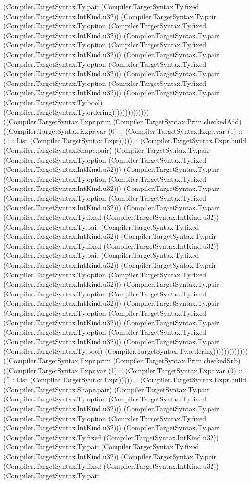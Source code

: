 \documentclass[11pt]{article}
\begin{document}
(Compiler.TargetSyntax.Ty.pair (Compiler.TargetSyntax.Ty.fixed (Compiler.TargetSyntax.IntKind.u32)) (Compiler.TargetSyntax.Ty.pair (Compiler.TargetSyntax.Ty.option (Compiler.TargetSyntax.Ty.fixed (Compiler.TargetSyntax.IntKind.u32))) (Compiler.TargetSyntax.Ty.pair (Compiler.TargetSyntax.Ty.option (Compiler.TargetSyntax.Ty.fixed (Compiler.TargetSyntax.IntKind.u32))) (Compiler.TargetSyntax.Ty.pair (Compiler.TargetSyntax.Ty.option (Compiler.TargetSyntax.Ty.fixed (Compiler.TargetSyntax.IntKind.u32))) (Compiler.TargetSyntax.Ty.pair (Compiler.TargetSyntax.Ty.option (Compiler.TargetSyntax.Ty.fixed (Compiler.TargetSyntax.IntKind.u32))) (Compiler.TargetSyntax.Ty.pair (Compiler.TargetSyntax.Ty.bool) (Compiler.TargetSyntax.Ty.ordering)))))))))))))) ((Compiler.TargetSyntax.Expr.prim (Compiler.TargetSyntax.Prim.checkedAdd) ((Compiler.TargetSyntax.Expr.var (0) :: (Compiler.TargetSyntax.Expr.var (1) :: ([] : List (Compiler.TargetSyntax.Expr))))) :: (Compiler.TargetSyntax.Expr.build (Compiler.TargetSyntax.Shape.pair) (Compiler.TargetSyntax.Ty.pair (Compiler.TargetSyntax.Ty.option (Compiler.TargetSyntax.Ty.fixed (Compiler.TargetSyntax.IntKind.u32))) (Compiler.TargetSyntax.Ty.pair (Compiler.TargetSyntax.Ty.option (Compiler.TargetSyntax.Ty.fixed (Compiler.TargetSyntax.IntKind.u32))) (Compiler.TargetSyntax.Ty.pair (Compiler.TargetSyntax.Ty.option (Compiler.TargetSyntax.Ty.fixed (Compiler.TargetSyntax.IntKind.u32))) (Compiler.TargetSyntax.Ty.pair (Compiler.TargetSyntax.Ty.fixed (Compiler.TargetSyntax.IntKind.u32)) (Compiler.TargetSyntax.Ty.pair (Compiler.TargetSyntax.Ty.fixed (Compiler.TargetSyntax.IntKind.u32)) (Compiler.TargetSyntax.Ty.pair (Compiler.TargetSyntax.Ty.fixed (Compiler.TargetSyntax.IntKind.u32)) (Compiler.TargetSyntax.Ty.pair (Compiler.TargetSyntax.Ty.fixed (Compiler.TargetSyntax.IntKind.u32)) (Compiler.TargetSyntax.Ty.pair (Compiler.TargetSyntax.Ty.option (Compiler.TargetSyntax.Ty.fixed (Compiler.TargetSyntax.IntKind.u32))) (Compiler.TargetSyntax.Ty.pair (Compiler.TargetSyntax.Ty.option (Compiler.TargetSyntax.Ty.fixed (Compiler.TargetSyntax.IntKind.u32))) (Compiler.TargetSyntax.Ty.pair (Compiler.TargetSyntax.Ty.option (Compiler.TargetSyntax.Ty.fixed (Compiler.TargetSyntax.IntKind.u32))) (Compiler.TargetSyntax.Ty.pair (Compiler.TargetSyntax.Ty.option (Compiler.TargetSyntax.Ty.fixed (Compiler.TargetSyntax.IntKind.u32))) (Compiler.TargetSyntax.Ty.pair (Compiler.TargetSyntax.Ty.bool) (Compiler.TargetSyntax.Ty.ordering))))))))))))) ((Compiler.TargetSyntax.Expr.prim (Compiler.TargetSyntax.Prim.checkedSub) ((Compiler.TargetSyntax.Expr.var (1) :: (Compiler.TargetSyntax.Expr.var (0) :: ([] : List (Compiler.TargetSyntax.Expr))))) :: (Compiler.TargetSyntax.Expr.build (Compiler.TargetSyntax.Shape.pair) (Compiler.TargetSyntax.Ty.pair (Compiler.TargetSyntax.Ty.option (Compiler.TargetSyntax.Ty.fixed (Compiler.TargetSyntax.IntKind.u32))) (Compiler.TargetSyntax.Ty.pair (Compiler.TargetSyntax.Ty.option (Compiler.TargetSyntax.Ty.fixed (Compiler.TargetSyntax.IntKind.u32))) (Compiler.TargetSyntax.Ty.pair (Compiler.TargetSyntax.Ty.fixed (Compiler.TargetSyntax.IntKind.u32)) (Compiler.TargetSyntax.Ty.pair (Compiler.TargetSyntax.Ty.fixed (Compiler.TargetSyntax.IntKind.u32)) (Compiler.TargetSyntax.Ty.pair (Compiler.TargetSyntax.Ty.fixed (Compiler.TargetSyntax.IntKind.u32)) (Compiler.TargetSyntax.Ty.pair 
\end{document}
